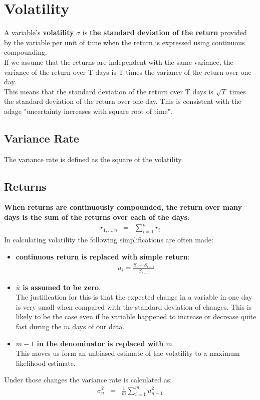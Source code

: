 \chapter{Volatility}
A variable's \textbf{\color{blue}volatility} $\sigma$ is \textbf{\color{blue}the standard deviation of the return} provided by the variable per unit of time when the return is expressed using continuous compounding.\\
If we assume that the returns are independent with the same variance, the variance of the return over T days is T times the variance of the return over one day.\\
This means that the standard deviation of the return over T days is $\sqrt{T}$ times the standard deviation of the return over one day. This is consistent with the adage "uncertainty increases with square root of time".

\section{Variance Rate}
The variance rate is defined as the square of the volatility.

\section{Returns}
\textbf{\color{blue}When returns are continuously compounded, the return over many days is the sum of the returns over each of the days}:
\begin{eqnarray}
	r_{1, ..., n} &=& \sum_{i = 1}^{n}r_{i}
\end{eqnarray}
In calculating volatility the following simplifications are often made:
\begin{itemize}
	\item \textbf{\color{ForestGreen}continuous return is replaced with simple return}:
	\begin{eqnarray}
		u_{i} = \frac{S_{i} - S_{i - 1}}{S_{i - 1}}
	\end{eqnarray}
	\item \textbf{\color{ForestGreen}$\bar{u}$ is assumed to be zero}.\\
	The justification for this is that the expected change in a variable in one day is very small when compared with the standard deviation of changes. This is likely to be the case even if he variable happened to increase or decrease quite fast during the $m$ days of our data. 
	\item \textbf{\color{ForestGreen}$m - 1$ in the denominator is replaced with $m$}.\\
	This moves us form an unbiased estimate of the volatility to a maximum likelihood estimate.
\end{itemize}
Under those changes the variance rate is calculated as:
\begin{eqnarray}
	\sigma_{n}^{2} &=& \frac{1}{m}\sum_{i = 1}^{m}u_{n - 1}^{2}
\end{eqnarray}

